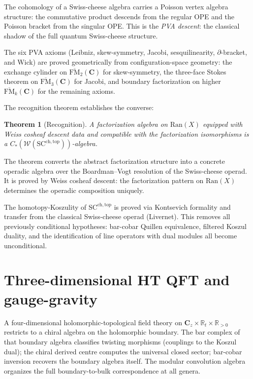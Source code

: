\documentclass[11pt,reqno]{amsart}
\newtheorem{theorem}{Theorem}[section]
\theoremstyle{definition}
\theoremstyle{remark}
\providecommand{\Ran}{\mathrm{Ran}}
\providecommand{\FM}{\overline{\mathrm{FM}}}
\renewcommand{\Bbbk}{\mathbf{C}}
\numberwithin{equation}{section}
\begin{document}
The cohomology of a Swiss-cheese algebra carries a Poisson
vertex algebra structure: the commutative product descends
from the regular OPE and the Poisson bracket from the singular
OPE. This is the \emph{PVA descent}: the classical shadow of
the full quantum Swiss-cheese structure.

The six PVA axioms (Leibniz, skew-symmetry, Jacobi, sesqui\-linearity,
$\partial$-bracket, and Wick) are proved geometrically from
configuration-space geometry: the exchange cylinder on
$\FM_2(\Bbbk)$ for skew-symmetry, the three-face Stokes
theorem on $\FM_3(\Bbbk)$ for Jacobi, and boundary
factorization on higher $\FM_k(\Bbbk)$ for the remaining
axioms.

The recognition theorem establishes the converse:

\begin{theorem}[Recognition]
\label{thm:recognition}
A factorization algebra on\/ $\Ran(X)$ equipped with Weiss
cosheaf descent data and compatible with the factorization
isomorphisms is a $C_*(\mathcal{W}(\mathrm{SC}^{\mathrm{ch,top}}))$-algebra.
\end{theorem}

The theorem converts the abstract factorization structure
into a concrete operadic algebra over the Boardman--Vogt
resolution of the Swiss-cheese operad. It is proved by Weiss
cosheaf descent: the factorization pattern on $\Ran(X)$
determines the operadic composition uniquely.

The homotopy-Koszulity of $\mathrm{SC}^{\mathrm{ch,top}}$
is proved via Kontsevich formality and transfer from the
classical Swiss-cheese operad (Livernet). This removes all
previously conditional hypotheses: bar-cobar Quillen
equivalence, filtered Koszul duality, and the identification
of line operators with dual modules all become unconditional.


\section{Three-dimensional HT QFT and gauge-gravity}
\label{sec:ht-qft}

A four-dimensional holomorphic-topological field theory on
$\Bbbk_z \times \mathbb{R}_t \times \mathbb{R}_{>0}$
restricts to a chiral algebra on the holomorphic boundary.
The bar complex of that boundary algebra classifies
twisting morphisms (couplings to the Koszul dual); the
chiral derived centre computes the universal closed sector; bar-cobar
inversion recovers the boundary algebra itself. The modular
convolution algebra organizes the full boundary-to-bulk
correspondence at all genera.
\end{document}
